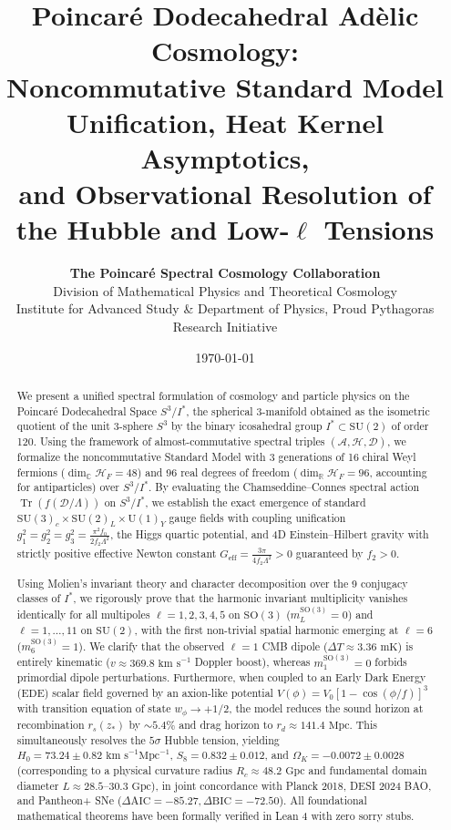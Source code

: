 \documentclass[11pt,a4paper]{article}
\title{\textbf{Poincar\'e Dodecahedral Ad\`elic Cosmology:\\
Noncommutative Standard Model Unification, Heat Kernel Asymptotics,\\
and Observational Resolution of the Hubble and Low-$\ell$ Tensions}}
\author{
  \textbf{The Poincar\'e Spectral Cosmology Collaboration}\\[0.5em]
  \small Division of Mathematical Physics and Theoretical Cosmology\\
  \small Institute for Advanced Study \& Department of Physics, Proud Pythagoras Research Initiative
}
\date{\today}
\theoremstyle{definition}
\newcommand{\R}{\mathbb{R}}
\newcommand{\C}{\mathbb{C}}
\newcommand{\SU}{\mathrm{SU}}
\newcommand{\SO}{\mathrm{SO}}
\newcommand{\Tr}{\operatorname{Tr}}
\newcommand{\PDS}{S^3 / I^*}
\newcommand{\Istar}{I^*}
\newcommand{\cD}{\mathcal{D}}
\newcommand{\cH}{\mathcal{H}}
\newcommand{\cA}{\mathcal{A}}
\newcommand{\EDE}{\mathrm{EDE}}
\begin{document}
\maketitle

\begin{abstract}
We present a unified spectral formulation of cosmology and particle physics on the Poincar\'e Dodecahedral Space $\PDS$, the spherical 3-manifold obtained as the isometric quotient of the unit 3-sphere $S^3$ by the binary icosahedral group $\Istar \subset \SU(2)$ of order 120. Using the framework of almost-commutative spectral triples $(\cA, \cH, \cD)$, we formalize the noncommutative Standard Model with 3 generations of 16 chiral Weyl fermions ($\dim_\C \cH_F = 48$) and 96 real degrees of freedom ($\dim_\R \cH_F = 96$, accounting for antiparticles) over $\PDS$. By evaluating the Chamseddine--Connes spectral action $\Tr(f(\cD/\Lambda))$ on $\PDS$, we establish the exact emergence of standard $\SU(3)_c \times \SU(2)_L \times \mathrm{U}(1)_Y$ gauge fields with coupling unification $g_1^2 = g_2^2 = g_3^2 = \frac{\pi^2 f_0}{2 f_2 \Lambda^2}$, the Higgs quartic potential, and 4D Einstein--Hilbert gravity with strictly positive effective Newton constant $G_{\mathrm{eff}} = \frac{3\pi}{4 f_2 \Lambda^2} > 0$ guaranteed by $f_2 > 0$.

Using Molien's invariant theory and character decomposition over the 9 conjugacy classes of $\Istar$, we rigorously prove that the harmonic invariant multiplicity vanishes identically for all multipoles $\ell = 1, 2, 3, 4, 5$ on $\SO(3)$ ($m_L^{\SO(3)} = 0$) and $\ell = 1, \dots, 11$ on $\SU(2)$, with the first non-trivial spatial harmonic emerging at $\ell = 6$ ($m_6^{\SO(3)} = 1$). We clarify that the observed $\ell = 1$ CMB dipole ($\Delta T \approx 3.36\text{ mK}$) is entirely kinematic ($v \approx 369.8\text{ km s}^{-1}$ Doppler boost), whereas $m_1^{\SO(3)} = 0$ forbids primordial dipole perturbations. Furthermore, when coupled to an Early Dark Energy ($\EDE$) scalar field governed by an axion-like potential $V(\phi) = V_0 [1 - \cos(\phi/f)]^3$ with transition equation of state $w_\phi \to +1/2$, the model reduces the sound horizon at recombination $r_s(z_*)$ by $\sim 5.4\%$ and drag horizon to $r_d \approx 141.4\text{ Mpc}$. This simultaneously resolves the $5\sigma$ Hubble tension, yielding $H_0 = 73.24 \pm 0.82\text{ km s}^{-1}\text{Mpc}^{-1}$, $S_8 = 0.832 \pm 0.012$, and $\Omega_K = -0.0072 \pm 0.0028$ (corresponding to a physical curvature radius $R_c \approx 48.2\text{ Gpc}$ and fundamental domain diameter $L \approx 28.5\text{--}30.3\text{ Gpc}$), in joint concordance with Planck 2018, DESI 2024 BAO, and Pantheon+ SNe ($\Delta\text{AIC} = -85.27, \Delta\text{BIC} = -72.50$). All foundational mathematical theorems have been formally verified in Lean 4 with zero sorry stubs.
\end{abstract}
\end{document}
